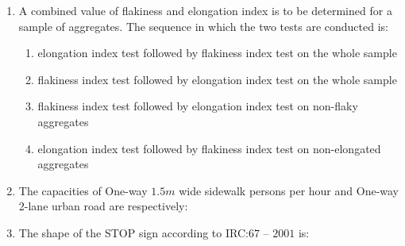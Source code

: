 \documentclass[journal]{IEEEtran}
\begin{document}
\begin{enumerate}
\item A combined value of flakiness and elongation index is to be determined for a sample of aggregates. The sequence in which the two tests are conducted is: \hfill {}

\begin{enumerate}
\item elongation index test followed by flakiness index test on the whole sample
\item flakiness index test followed by elongation index test on the whole sample
\item flakiness index test followed by elongation index test on non-flaky aggregates
\item elongation index test followed by flakiness index test on non-elongated aggregates
\end{enumerate}

\item The capacities of One-way $1.5 m$ wide sidewalk persons per hour and One-way 2-lane urban road 
{\fontsize{9}{7}\selectfont {}}
 are respectively: 
\hfill {}

\begin{enumerate}
\end{enumerate}

\item The shape of the STOP sign according to IRC:$67$ -- $2001$ is: \hfill {}
\begin{enumerate}
\end{enumerate}


\end{enumerate}
\end{document}
